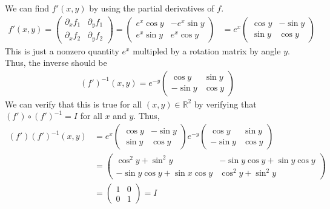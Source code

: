 \documentclass{exam}
\numberwithin{equation}{section}
\newcommand{\R}{\mathbb{R}}
\begin{document}
\begin{enumerate}[label=(\alph*)]
        We can find $f'(x,y)$ by using the partial derivatives of $f$.
        \begin{align*}
            f'(x,y)=\begin{pmatrix}
                \partial_x f_1 & \partial_y f_1\\
                \partial_x f_2 & \partial_y f_2
            \end{pmatrix}=\begin{pmatrix}
                e^x\cos y&-e^x\sin y\\
                e^x\sin y&e^x\cos y
            \end{pmatrix}&=e^x\begin{pmatrix}
                \cos y&-\sin y\\
                \sin y&\cos y
            \end{pmatrix}
        \end{align*}
        This is just a nonzero quantity $e^x$ multipled by a rotation matrix by angle $y$. Thus, the inverse should be 
        \begin{align*}
            (f')^{-1}(x,y)=e^{-y}\begin{pmatrix}
                \cos y&\sin y\\-\sin y&\cos y
            \end{pmatrix}
        \end{align*}
        We can verify that this is true for all $(x,y)\in\R^2$ by verifying that $(f')\circ(f')^{-1}=I$ for all $x$ and $y$.  Thus,
        \begin{align*}
            (f')(f')^{-1}(x,y)&=e^x\begin{pmatrix}
                \cos y&-\sin y\\
                \sin y&\cos y
            \end{pmatrix}e^{-y}\begin{pmatrix}
                \cos y&\sin y\\-\sin y&\cos y
            \end{pmatrix}\\
            &=\begin{pmatrix}
                \cos^2y+\sin^2y&-\sin y\cos y+\sin y\cos y\\
                -\sin y\cos y+\sin x\cos y&\cos^2y+\sin^2y
            \end{pmatrix}\\
            &=\begin{pmatrix}
                1&0\\0&1
            \end{pmatrix}=I
        \end{align*}
    \end{enumerate}
\end{document}
